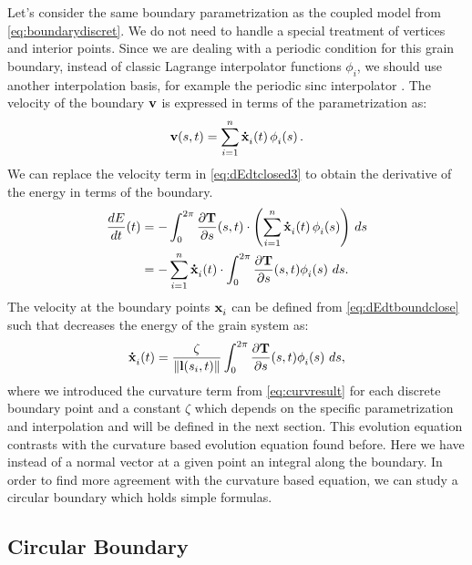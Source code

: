 Let's consider the same boundary parametrization as the coupled model from \eqref{eq:boundarydiscret}. We do not need to handle a special treatment of vertices and interior points.  Since we are dealing with a periodic condition for this grain boundary, instead of classic Lagrange interpolator functions $\phi_i$, we should use another interpolation basis, for example the periodic sinc interpolator \cite{trefethen2000spectral}. The velocity of the boundary $\mathbf{v}$ is expressed in terms of the parametrization as:
\begin{equation}
    \vel(s,t) = \velboundary.
\end{equation}
We can replace the velocity term in \eqref{eq:dEdtclosed3} to obtain the derivative of the energy in terms of the boundary.
\begin{align}
    \dfrac{dE}{dt}(t)
    &= -\int_0^{2\pi} \dTds(s,t) \cdot \left( \velboundary \right)\, ds \nonumber \\
    &= -\sum_{i=1}^{n}  \dotx[i](t) \cdot \int_0^{2\pi}  \dTds(s,t) \phii{i}{s}\, ds.
    \label{eq:dEdtboundclose}
\end{align}
The velocity at the boundary points $\x[i]$ can be defined from \eqref{eq:dEdtboundclose} such that decreases the energy of the grain system as:
\begin{equation}
    \dotx[i](t)= \frac{\zeta}{\norm{\mylvec(s_i,t)}}\int_0^{2\pi}  \dTds(s,t) \phii{i}{s}\, ds,
    \label{eq:coupledvelocity}
\end{equation}
%
where we introduced the curvature term from \eqref{eq:curvresult} for each discrete boundary point and a constant $\zeta$ which depends on the specific parametrization and interpolation and will be defined in the next section. This evolution equation contrasts with the curvature based evolution equation found before. Here we have instead of a normal vector at a given point an integral along the boundary. In order to find more agreement with the curvature based equation, we can study a circular boundary which holds simple formulas.


\subsection{Circular Boundary}
\label{sec:circularboundary}

